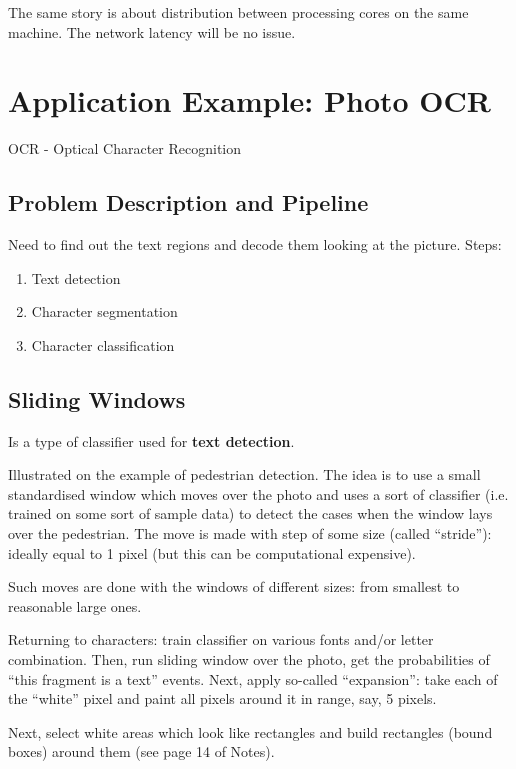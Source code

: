 \documentclass{scrartcl}
\begin{document}
The same story is about distribution between processing cores on the
same machine. The network latency will be no issue.

\section{Application Example: Photo OCR}
\label{sec:18}

OCR - Optical Character Recognition

\subsection{Problem Description and Pipeline}
\label{sec:18-1}

Need to find out the text regions and decode them looking at the
picture. Steps:
\begin{enumerate}
\item Text detection
\item Character segmentation
\item Character classification
\end{enumerate}

\subsection{Sliding Windows}
\label{sec:18-2}

Is a type of classifier used for {\bf text detection}.

Illustrated on the example of pedestrian detection. The idea is to use
a small standardised window which moves over the photo and uses a sort
of classifier (i.e. trained on some sort of sample data) to detect the
cases when the window lays over the pedestrian. The move is made with
step of some size (called ``stride''): ideally equal to 1 pixel (but
this can be computational expensive). 

Such moves are done with the windows of different sizes: from smallest
to reasonable large ones.

Returning to characters: train classifier on various fonts and/or
letter combination. Then, run sliding window over the photo, get the
probabilities of ``this fragment is a text'' events. Next, apply
so-called ``expansion'': take each of the ``white'' pixel and paint
all pixels around it in range, say, 5 pixels.

Next, select white areas which look like rectangles and build
rectangles (bound boxes) around them (see page 14 of Notes).
\end{document}
